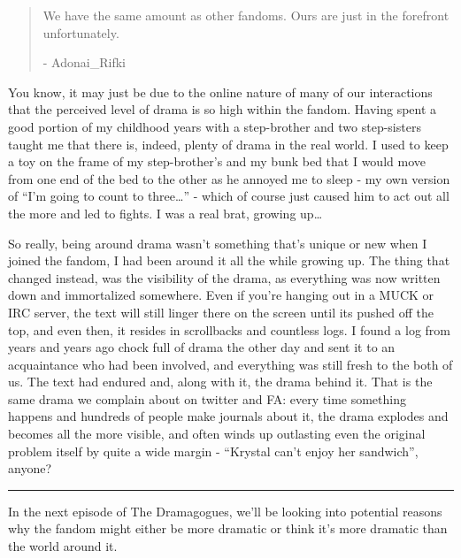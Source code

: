 \begin{quote}
We have the same amount as other fandoms. Ours are just in the forefront
unfortunately.

- Adonai\_Rifki
\end{quote}

You know, it may just be due to the online nature of many of our
interactions that the perceived level of drama is so high within the
fandom. Having spent a good portion of my childhood years with a
step-brother and two step-sisters taught me that there is, indeed,
plenty of drama in the real world. I used to keep a toy on the frame of
my step-brother's and my bunk bed that I would move from one end of the
bed to the other as he annoyed me to sleep - my own version of ``I'm
going to count to three\ldots{}'' - which of course just caused him to
act out all the more and led to fights. I was a real brat, growing
up\ldots{}

So really, being around drama wasn't something that's unique or new when
I joined the fandom, I had been around it all the while growing up. The
thing that changed instead, was the visibility of the drama, as
everything was now written down and immortalized somewhere. Even if
you're hanging out in a MUCK or IRC server, the text will still linger
there on the screen until its pushed off the top, and even then, it
resides in scrollbacks and countless logs. I found a log from years and
years ago chock full of drama the other day and sent it to an
acquaintance who had been involved, and everything was still fresh to
the both of us. The text had endured and, along with it, the drama
behind it. That is the same drama we complain about on twitter and FA:
every time something happens and hundreds of people make journals about
it, the drama explodes and becomes all the more visible, and often winds
up outlasting even the original problem itself by quite a wide margin -
``Krystal can't enjoy her sandwich'', anyone?

\begin{center}\rule{0.5\linewidth}{\linethickness}\end{center}

In the next episode of The Dramagogues, we'll be looking into potential
reasons why the fandom might either be more dramatic or think it's more
dramatic than the world around it.
